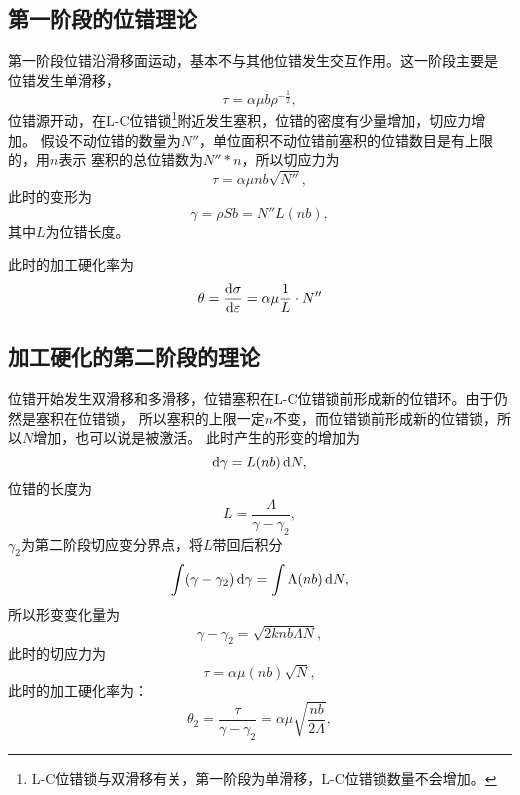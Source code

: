        \subsection{第一阶段的位错理论}
        第一阶段位错沿滑移面运动，基本不与其他位错发生交互作用。这一阶段主要是
        位错发生单滑移，
        \begin{equation}
            \tau=\alpha\mu b\rho^{-\frac{1}{2}},
        \end{equation}
        位错源开动，在L-C位错锁\footnote{L-C位错锁与双滑移有关，第一阶段为单滑移，L-C位错锁数量不会增加。}附近发生塞积，位错的密度有少量增加，切应力增加。
        假设不动位错的数量为$N''$，单位面积不动位错前塞积的位错数目是有上限的，用$n$表示
        塞积的总位错数为$N''*n$，所以切应力为
        \begin{equation}
            \tau=\alpha\mu nb\sqrt{N''},
        \end{equation}
        此时的变形为
        \begin{equation}
            \gamma=\rho Sb=N''L(nb),
        \end{equation}
        其中$L$为位错长度。
        
        此时的加工硬化率为
        \begin{equation}
            \theta=\frac{\mathop{}\!\mathrm{d}\sigma}{\mathop{}\!\mathrm{d} \varepsilon}=\alpha\mu\frac{1}{L}\cdot N''
        \end{equation}

    \subsection{加工硬化的第二阶段的理论}
        位错开始发生双滑移和多滑移，位错塞积在L-C位错锁前形成新的位错环。由于仍然是塞积在位错锁，
        所以塞积的上限一定$n$不变，而位错锁前形成新的位错锁，所以$N$增加，也可以说是被激活。
        此时产生的形变的增加为
        \begin{equation}
            \mathop{}\!\mathrm{d} \gamma=L(nb)\mathop{}\!\mathrm{d} N,
        \end{equation}
        位错的长度为
        \begin{equation}
            L=\frac{\Lambda}{\gamma-\gamma_2},
        \end{equation}
        $\gamma_2$为第二阶段切应变分界点，将$L$带回后积分
        \begin{equation}
            \int(\gamma-\gamma_2)\mathop{}\!\mathrm{d}\gamma=\int\Lambda(nb)\mathop{}\!\mathrm{d} N,
        \end{equation}
        所以形变变化量为
        \begin{equation}
            \gamma-\gamma_2=\sqrt{2knb\Lambda N},
        \end{equation}
        此时的切应力为
        \begin{equation}
            \tau=\alpha\mu(nb)\sqrt{N},
        \end{equation}
        此时的加工硬化率为：
        \begin{equation}
            \theta_2=\frac{\tau}{\gamma-\gamma_2}=\alpha\mu\sqrt{\frac{nb}{2\Lambda}},
        \end{equation}
